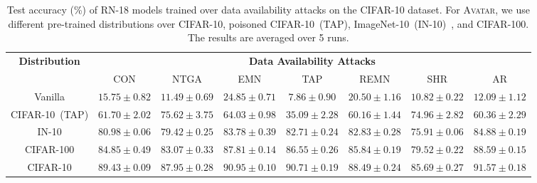 \documentclass[conference]{IEEEtran}
\theoremstyle{definition}
\theoremstyle{remark}
\theoremstyle{proposition}
\begin{document}
\begin{table}[t!]
	\caption{Test accuracy (\%) of RN-18 models trained over data availability attacks on the CIFAR-10 dataset. For \textsc{Avatar}, we use different pre-trained distributions over CIFAR-10, poisoned CIFAR-10~(TAP), ImageNet-10~(IN-10)~\citep{huang2021emn}, and CIFAR-100. The results are averaged over 5 runs.}
	\label{tab:dist_mismatch}
	\begin{center}
		\begin{small}
		    \setlength\tabcolsep{0.35em}
			\def\arraystretch{1.5}
			\begin{tabular}{cccccccc}
				\toprule
				\multirow{2}{*}{\textbf{Distribution}}
				&\multicolumn{7}{c}{\textbf{Data Availability Attacks}}\\
				\cmidrule(lr){2-8}
				                                              & CON & NTGA & EMN & TAP & REMN  & SHR & AR\\
				\midrule
				Vanilla           & $15.75 \pm 0.82$ & $11.49 \pm 0.69$ & $24.85 \pm 0.71$ & $7.86 \pm 0.90$ & $20.50 \pm 1.16$ & $10.82 \pm 0.22$  & $12.09 \pm 1.12$\\
                CIFAR-10~(TAP)    & $61.70 \pm 2.02$ & $75.62 \pm 3.75$ & $64.03 \pm 0.98$ & $35.09 \pm 2.28$ & $60.16 \pm 1.44$ & $74.96 \pm 2.82$ & $60.36 \pm 2.29$\\
                IN-10             & $80.98 \pm 0.06$ & $79.42 \pm 0.25$ & $83.78 \pm 0.39$ & $82.71 \pm 0.24$ & $82.83 \pm 0.28$ & $75.91 \pm 0.06$ & $84.88 \pm 0.19$\\
                CIFAR-100         & $84.85 \pm 0.49$ & $83.07 \pm 0.33$ & $87.81 \pm 0.14$ & $86.55 \pm 0.26$ & $85.84 \pm 0.19$ & $79.52 \pm 0.22$ & $88.59 \pm 0.15$\\
				CIFAR-10          & $89.43 \pm 0.09$ & $87.95 \pm 0.28$ & $90.95 \pm 0.10$ & $90.71 \pm 0.19$ & $88.49 \pm 0.24$ & $85.69 \pm 0.27$ & $91.57 \pm 0.18$\\
			    \bottomrule
			\end{tabular}
		\end{small}
	\end{center}
\end{table}
\end{document}
